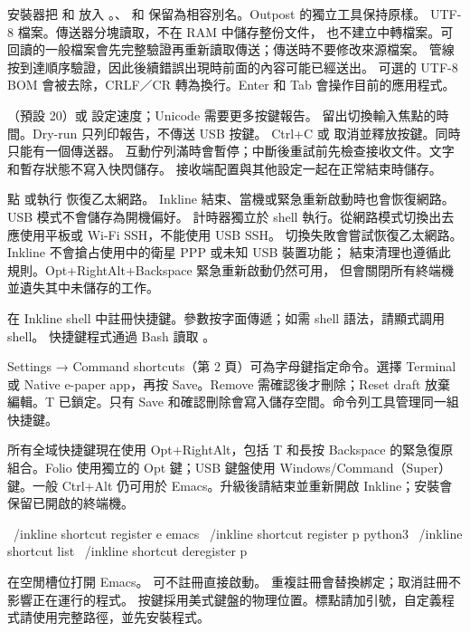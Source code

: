 安裝器把  和  放入
。、 和
 保留為相容別名。Outpost 的獨立工具保持原樣。
\UsbExamples
UTF-8 檔案。傳送器分塊讀取，不在 RAM 中儲存整份文件，
也不建立中轉檔案。可回讀的一般檔案會先完整驗證再重新讀取傳送；傳送時不要修改來源檔案。
管線按到達順序驗證，因此後續錯誤出現時前面的內容可能已經送出。
可選的 UTF-8 BOM 會被去除，CRLF／CR 轉為換行。Enter 和 Tab 會操作目前的應用程式。

（預設 20）或  設定速度；Unicode 需要更多按鍵報告。
 留出切換輸入焦點的時間。Dry-run 只列印報告，不傳送 USB 按鍵。
Ctrl+C 或  取消並釋放按鍵。同時只能有一個傳送器。
互動佇列滿時會暫停；中斷後重試前先檢查接收文件。文字和暫存狀態不寫入快閃儲存。
接收端配置與其他設定一起在正常結束時儲存。

點 或執行  恢復乙太網路。
Inkline 結束、當機或緊急重新啟動時也會恢復網路。USB 模式不會儲存為開機偏好。
\UsbRecoveryExample
計時器獨立於 shell 執行。從網路模式切換出去應使用平板或 Wi-Fi SSH，不能使用 USB SSH。
切換失敗會嘗試恢復乙太網路。Inkline 不會搶占使用中的衛星 PPP 或未知 USB 裝置功能；
結束清理也遵循此規則。Opt+RightAlt+Backspace 緊急重新啟動仍然可用，
但會關閉所有終端機並遺失其中未儲存的工作。

在 Inkline shell 中註冊快捷鍵。參數按字面傳遞；如需 shell 語法，請顯式調用 shell。
快捷鍵程式通過 Bash 讀取 。

Settings → Command shortcuts（第 2 頁）可為字母鍵指定命令。選擇 Terminal 或 Native e-paper app，再按 Save。Remove 需確認後才刪除；Reset draft 放棄編輯。T 已鎖定。只有 Save 和確認刪除會寫入儲存空間。命令列工具管理同一組快捷鍵。

所有全域快捷鍵現在使用 Opt+RightAlt，包括 T 和長按 Backspace 的緊急復原組合。Folio 使用獨立的 Opt 鍵；USB 鍵盤使用 Windows/Command（Super）鍵。一般 Ctrl+Alt 仍可用於 Emacs。升級後請結束並重新開啟 Inkline；安裝會保留已開啟的終端機。

\begin{shell}
~/inkline shortcut register e emacs
~/inkline shortcut register p python3
~/inkline shortcut list
~/inkline shortcut deregister p
\end{shell}

 在空閒槽位打開 Emacs。
 可不註冊直接啟動。
重複註冊會替換綁定；取消註冊不影響正在運行的程式。
按鍵採用美式鍵盤的物理位置。標點請加引號，自定義程式請使用完整路徑，並先安裝程式。


